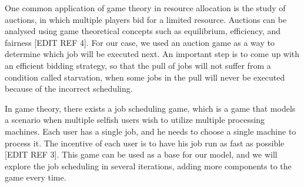 One common application of game theory in resource allocation is the study of auctions, in which multiple players bid for a limited resource. Auctions can be analysed using game theoretical concepts such as equilibrium, efficiency, and fairness [EDIT REF 4]. For our case, we used an auction game as a way to determine which job will be executed next. An important step is to come up with an efficient bidding strategy, so that the pull of jobs will not suffer from a condition called starvation, when some jobs in the pull will never be executed because of the incorrect scheduling.

In game theory, there exists a job scheduling game, which is a game that models a scenario when multiple selfish users wish to utilize multiple processing machines. Each user has a single job, and he needs to choose a single machine to process it. The incentive of each user is to have his job run as fast as possible [EDIT REF 3]. This game can be used as a base for our model, and we will explore the job scheduling in several iterations, adding more components to the game every time.

